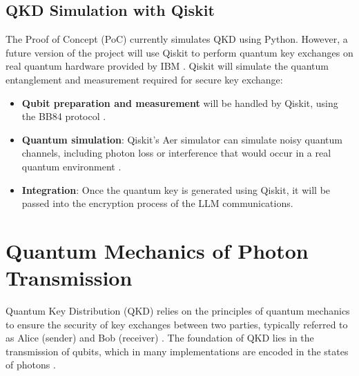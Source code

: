 \documentclass{article}
\begin{document}
\subsection{QKD Simulation with Qiskit}
The Proof of Concept (PoC) currently simulates QKD using Python. However, a future version of the project will use Qiskit to perform quantum key exchanges on real quantum hardware provided by IBM \cite{nsa2024}. Qiskit will simulate the quantum entanglement and measurement required for secure key exchange:
\begin{itemize}
    \item \textbf{Qubit preparation and measurement} will be handled by Qiskit, using the BB84 protocol \cite{bennett1984}.
    \item \textbf{Quantum simulation}: Qiskit’s Aer simulator can simulate noisy quantum channels, including photon loss or interference that would occur in a real quantum environment \cite{nielsen2010}.
    \item \textbf{Integration}: Once the quantum key is generated using Qiskit, it will be passed into the encryption process of the LLM communications.
\end{itemize}

\section{Quantum Mechanics of Photon Transmission}

Quantum Key Distribution (QKD) relies on the principles of quantum mechanics to ensure the security of key exchanges between two parties, typically referred to as Alice (sender) and Bob (receiver) \cite{patel2020}. The foundation of QKD lies in the transmission of qubits, which in many implementations are encoded in the states of photons \cite{lo2012}. 
\end{document}
